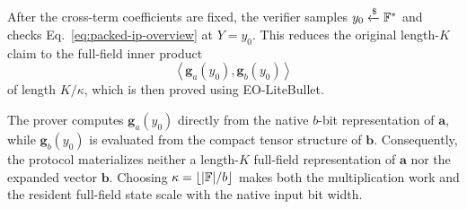 After the cross-term coefficients are fixed, the verifier samples
\(y_0\mathrel{\xleftarrow{\$}}{\mathbb{F}}^*\) and checks
Eq.~\eqref{eq:packed-ip-overview} at \(Y=y_0\).  This reduces the original
length-\(K\) claim to the full-field inner product
\[
    \left\langle
        \bm g_a(y_0),
        \bm g_b(y_0)
    \right\rangle
\]
of length \(K/\kappa\), which is then proved using EO-LiteBullet.

The prover computes \(\bm g_a(y_0)\) directly from the native \(b\)-bit
representation of \(\bm a\), while \(\bm g_b(y_0)\) is evaluated from the
compact tensor structure of \(\bm b\).  Consequently, the protocol
materializes neither a length-\(K\) full-field representation of
\(\bm a\) nor the expanded vector \(\bm b\).  Choosing
\(\kappa= \lfloor |{\mathbb{F}}|/b \rfloor\) makes both the multiplication work and the
resident full-field state scale with the native input bit width.